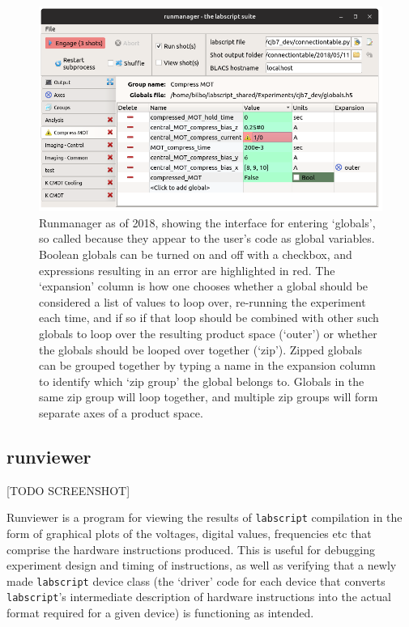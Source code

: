 \begin{figure}
\begin{center}
\includegraphics[width=\textwidth]{figures/software/new_screenshots/runmanager.png}
\caption{Runmanager as of 2018, showing the interface for entering `globals', so called because they appear to the user's code as global variables. Boolean globals can be turned on and off with a checkbox, and expressions resulting in an error are highlighted in red. The `expansion' column is how one chooses whether a global should be considered a list of values to loop over, re-running the experiment each time, and if so if that loop should be combined with other such globals to loop over the resulting product space (`outer') or whether the globals should be looped over together (`zip'). Zipped globals can be grouped together by typing a name in the expansion column to identify which `zip group' the global belongs to. Globals in the same zip group will loop together, and multiple zip groups will form separate axes of a product space.}\label{fig:runmanager}
\end{center}
\end{figure}

\subsection{runviewer}

[TODO SCREENSHOT]

Runviewer is a program for viewing the results of \texttt{labscript} compilation in the form of graphical plots of the voltages, digital values, frequencies etc that comprise the hardware instructions produced. This is useful for debugging experiment design and timing of instructions, as well as verifying that a newly made \texttt{labscript} device class (the `driver' code for each device that converts \texttt{labscript}'s intermediate description of hardware instructions into the actual format required for a given device) is functioning as intended.
